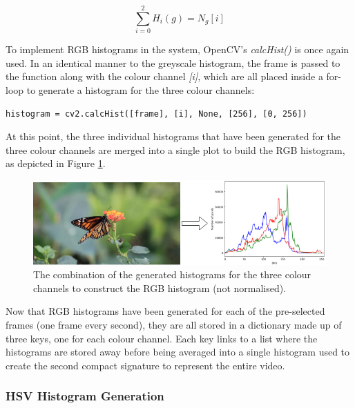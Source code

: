 \begin{equation}
\label{eq:rgb-histogram}
    \sum_{i=0}^{2} H_i(g)=N_g[i]
\end{equation}

To implement RGB histograms in the system, OpenCV's \textit{calcHist()} is once again used. In an identical manner to the greyscale histogram, the frame is passed to the function along with the colour channel \textit{[i]}, which are all placed inside a for-loop to generate a histogram for the three colour channels:

\begin{lstlisting}[numbers=none]
histogram = cv2.calcHist([frame], [i], None, [256], [0, 256])
\end{lstlisting}

At this point, the three individual histograms that have been generated for the three colour channels are merged into a single plot to build the RGB histogram, as depicted in Figure \ref{fig:implementation-rgb_not_normalised}.

\begin{figure}[h] 
\centerline{\includegraphics[width=\textwidth]{figures/implementation/rgb_not_normalised.png}}
\caption{\label{fig:implementation-rgb_not_normalised}The combination of the generated histograms for the three colour channels to construct the RGB histogram (not normalised).}
\end{figure}

Now that RGB histograms have been generated for each of the pre-selected frames (one frame every second), they are all stored in a dictionary made up of three keys, one for each colour channel. Each key links to a list where the histograms are stored away before being averaged into a single histogram used to create the second compact signature to represent the entire video. 


\subsubsection{HSV Histogram Generation}

